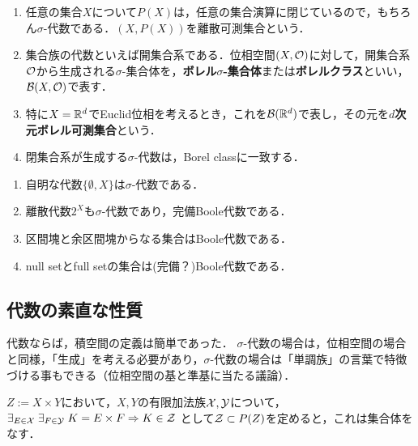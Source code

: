 \documentclass[uplatex, dvipdfmx]{jsreport}
\begin{document}
\begin{example}\mbox{}
    \begin{enumerate}
        \item 任意の集合$X$について$P(X)$は，任意の集合演算に閉じているので，もちろん$\sigma$-代数である．$(X,P(X))$を離散可測集合という．
        \item 集合族の代数といえば開集合系である．位相空間$(X,\mathcal{O})$に対して，開集合系$\mathcal{O}$から生成される$\sigma$-集合体を，\textbf{ボレル$\sigma$-集合体}または\textbf{ボレルクラス}といい，$\mathcal{B}(X,\mathcal{O})$で表す．
        \item 特に$X=\mathbb{R}^d$でEuclid位相を考えるとき，これを$\mathcal{B}(\mathbb{R}^d)$で表し，その元を\textbf{$d$次元ボレル可測集合}という．
        \item 閉集合系が生成する$\sigma$-代数は，Borel classに一致する．
    \end{enumerate}
\end{example}

\begin{example}\mbox{}
    \begin{enumerate}
        \item 自明な代数$\{\emptyset,X\}$は$\sigma$-代数である．
        \item 離散代数$2^X$も$\sigma$-代数であり，完備Boole代数である．
        \item 区間塊と余区間塊からなる集合はBoole代数である．
        \item null setとfull setの集合は(完備？)Boole代数である．
    \end{enumerate}
\end{example}

\subsection{代数の素直な性質}

\begin{tcolorbox}[colframe=ForestGreen, colback=ForestGreen!10!white,breakable,colbacktitle=ForestGreen!40!white,coltitle=black,fonttitle=\bfseries\sffamily,
title=]
    代数ならば，積空間の定義は簡単であった．
    $\sigma$-代数の場合は，位相空間の場合と同様，「生成」を考える必要があり，$\sigma$-代数の場合は「単調族」の言葉で特徴づける事もできる（位相空間の基と準基に当たる議論）．
\end{tcolorbox}

\begin{proposition}
    $Z:=X\times Y$において，$X,Y$の有限加法族$\mathcal{X},\mathcal{Y}$について，
    $\exists_{E\in\mathcal{X}}\;\exists_{F\in\mathcal{Y}}\;K=E\times F\Rightarrow K\in\mathcal{Z}$
    として$\mathcal{Z}\subset P(Z)$を定めると，これは集合体をなす．
\end{proposition}
\end{document}
